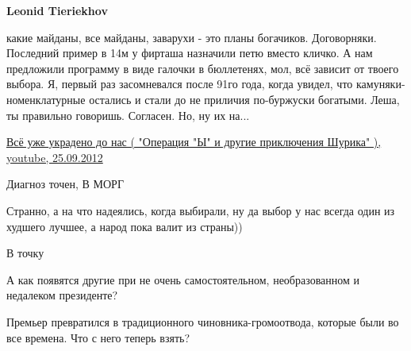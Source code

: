 \begin{itemize}
\begin{itemize}
\textbf{Leonid Tieriekhov} 

какие майданы, все майданы, заварухи - это планы богачиков. Договорняки.
Последний пример в 14м у фирташа назначили петю вместо кличко. А нам предложили
программу в виде галочки в бюллетенях, мол, всё зависит от твоего выбора. Я,
первый раз засомневался после 91го года, когда увидел, что
камуняки-номенклатурные остались и стали до не приличия по-буржуски богатыми.
Леша, ты правильно говоришь. Согласен. Но, ну их на...


\href{https://www.youtube.com/watch?v=SrwlxcEZC4Q}{%
Всё уже украдено до нас ( "Операция "Ы" и другие приключения Шурика" ), youtube, 25.09.2012%
}

\end{itemize} %

Диагноз точен, В МОРГ

Странно, а на что надеялись, когда выбирали, ну да выбор у нас всегда один из худшего лучшее, а народ пока валит из страны))

В точку

А как появятся другие при не очень самостоятельном, необразованном и недалеком президенте?

Премьер превратился в традиционного чиновника-громоотвода, которые были во все времена. Что с него теперь взять?
\end{itemize} %

